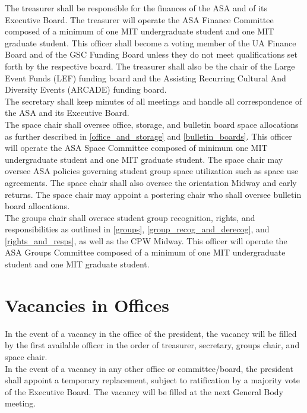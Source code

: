 \documentclass[12pt]{article}
\begin{document}
The treasurer shall be responsible for the finances of the ASA and of its Executive Board.
The treasurer will operate the ASA Finance Committee composed of a minimum of one MIT undergraduate student
    and one MIT graduate student.
This officer shall become a voting member of the UA Finance Board and of the GSC Funding Board unless
    they do not meet qualifications set forth by the respective board.
The treasurer shall also be the chair of the Large Event Funds (LEF) funding board and the Assisting
    Recurring Cultural And Diversity Events (ARCADE) funding board.
\\

The secretary shall keep minutes of all meetings and handle all correspondence of the ASA and its Executive Board.
\\

The space chair shall oversee office, storage, and bulletin board space allocations as further described
    in \ref{office_and_storage} and \ref{bulletin_boards}.
This officer will operate the ASA Space Committee composed of minimum one MIT undergraduate student and one
    MIT graduate student.
The space chair may oversee ASA policies governing student group space utilization such as space use agreements.
The space chair shall also oversee the orientation Midway and early returns.
The space chair may appoint a postering chair who shall oversee bulletin board allocations.
\\

The groups chair shall oversee student group recognition, rights, and responsibilities as outlined in
    \ref{groups}, \ref{group_recog_and_derecog}, and \ref{rights_and_resps}, as well as the CPW Midway.
This officer will operate the ASA Groups Committee composed of a minimum of one MIT undergraduate student and one
    MIT graduate student.

\section{Vacancies in Offices}
\label{asa_exec_vacancies}
In the event of a vacancy in the office of the president, the vacancy will be filled by the first available
    officer in the order of treasurer, secretary, groups chair, and space chair.
\\

In the event of a vacancy in any other office or committee/board, the president shall appoint a
    temporary replacement, subject to ratification by a majority vote of the Executive Board.
The vacancy will be filled at the next General Body meeting.
\end{document}
